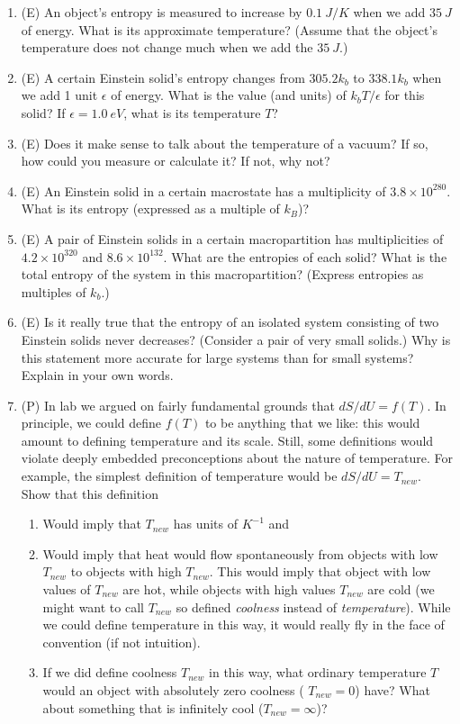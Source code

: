 \begin{enumerate}
 
\item (E) An object's entropy is measured to increase by $0.1~ J/K$ 
when we add $35~ J$ of energy.  What is its approximate temperature?  
(Assume that the object's temperature does not change much when we add the $35~J$.)

\item (E) A certain Einstein solid's entropy changes from 
$305.2k_b$ to $338.1k_b$ when we add 1 unit $\epsilon$ of energy.  
What is the value (and units) of $k_bT/\epsilon$ for this solid?  
If $\epsilon = 1.0~eV$, what is its temperature $T$?

\item (E) Does it make sense to talk about the 
temperature of a vacuum?  If so, how could you measure or calculate it?  
If not, why not?  

\item (E) An Einstein solid in a certain macrostate has a multiplicity of $3.8 \times 10^{280}$.  
What is its entropy (expressed as a multiple of $k_B$)?

\item (E) A pair of Einstein solids in a certain macropartition has multiplicities of 
$4.2 \times 10^{320}$ and $8.6 \times 10^{132}$.  What are the entropies of 
each solid?  What is the total 
entropy of the system in this macropartition?  (Express entropies as multiples of $k_b$.)

\item (E) Is it really true that the entropy of an isolated system consisting of two 
Einstein solids never decreases?  (Consider a pair of very small solids.)  Why is this 
statement more accurate for large systems than for small systems?  Explain in your own words.

\item (P) In lab we argued on fairly fundamental grounds 
that $dS/dU = f(T)$.  In principle, we could define $f(T)$ to be anything 
that we like:  this would amount to defining temperature and its scale. 
Still, some definitions would violate deeply embedded preconceptions 
about the nature of temperature.  
For example, the simplest definition of temperature would be $dS/dU = T_{new}$.  
Show that this definition
\begin{enumerate}
\item Would imply that $T_{new}$ has units of $K^{-1}$ and
\item Would imply that heat would flow spontaneously from objects with 
low $T_{new}$ to objects with high $T_{new}$.  
This would imply that object with low values of $T_{new}$ are hot, while 
objects with high values $T_{new}$ are cold (we might want to call $T_{new}$ 
so defined {\it coolness} instead of {\it temperature}).  
While we could define temperature in this way, it would really fly 
in the face of convention (if not intuition).
\item If we did define coolness $T_{new}$ in this way, what ordinary 
temperature $T$ would an object with absolutely zero coolness (
$T_{new} = 0$) have?  What about something that is infinitely cool ($T_{new} = \infty$)?
\end{enumerate}


\end{enumerate}
